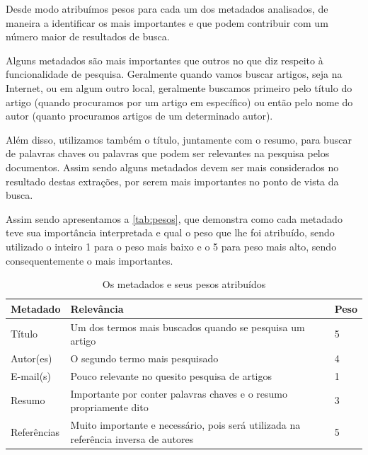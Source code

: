 Desde modo atribuímos pesos para cada um dos metadados analisados, de maneira a identificar os mais importantes e que podem contribuir com um número maior de resultados de busca. 


Alguns metadados são mais importantes que outros no que diz respeito à funcionalidade de pesquisa. Geralmente quando vamos buscar artigos, seja na Internet, ou em algum outro local, geralmente buscamos primeiro pelo título do artigo (quando procuramos por um artigo em específico) ou então pelo nome do autor (quanto procuramos artigos de um determinado autor).

Além disso, utilizamos também o título, juntamente com o resumo, para buscar de palavras chaves ou palavras que podem ser relevantes na pesquisa pelos documentos. Assim sendo alguns metadados devem ser mais considerados no resultado destas extrações, por serem mais importantes no ponto de vista da busca.

Assim sendo apresentamos a \autoref{tab:pesos}, que demonstra como cada metadado teve sua importância interpretada e qual o peso que lhe foi atribuído, sendo utilizado o inteiro 1 para o peso mais baixo e o 5 para peso mais alto, sendo consequentemente o mais importantes.


\begin{table}
    \caption{Os metadados e seus pesos atribuídos}
    \begin{center}
    	\begin{tabular}{|p{3cm}|p{8cm}|C{1cm}|}
			\hline \textbf{Metadado} & \textbf{Relevância} & \textbf{Peso} \\ 
			\hline Título & Um dos termos mais buscados quando se pesquisa um artigo & 5 \\
	    	\hline Autor(es) & O segundo termo mais pesquisado & 4 \\
	    	\hline E-mail(s) & Pouco relevante no quesito pesquisa de artigos & 1 \\
	    	\hline Resumo & Importante por conter palavras chaves e o resumo propriamente dito & 3 \\
	    	\hline Referências & Muito importante e necessário, pois será utilizada na referência inversa de autores & 5 \\
	    	\hline 
    	\end{tabular} 
    \end{center}
  	\label{tab:pesos}
\end{table}

